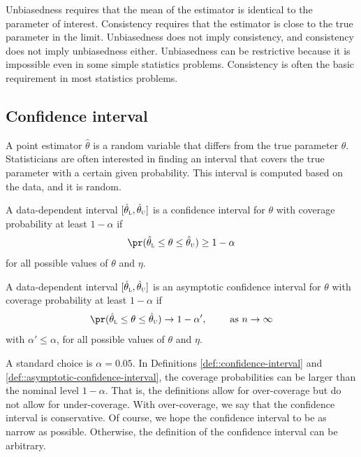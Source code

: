 Unbiasedness requires that the mean of the estimator is identical to the parameter of interest. Consistency requires that the estimator is close to the true parameter in the limit. Unbiasedness does not imply consistency, and consistency does not imply unbiasedness either. Unbiasedness can be restrictive because it is impossible even in some simple statistics problems. Consistency is often the basic requirement in most statistics problems. 





\subsection{Confidence interval}



A point estimator $\hat\theta$ is a random variable that differs from the true parameter $\theta$. Statisticians are often interested in finding an interval that covers the true parameter with a certain given probability. This interval is computed based on the data, and it is random. 

\begin{definition}
\label{def::confidence-interval}
A data-dependent interval $[  \hat\theta_\textsc{l} , \hat\theta_\textsc{u} ] $ is a confidence interval for $\theta$ with coverage probability at least $1-\alpha$ if
$$
\pr(    \hat\theta_\textsc{l}    \leq \theta \leq  \hat\theta_\textsc{u}  ) \geq 1-\alpha 
$$
for all possible values of $\theta$ and $\eta$.  
\end{definition}


\begin{definition}
\label{def::asymptotic-confidence-interval}
A data-dependent interval $[  \hat\theta_\textsc{l} , \hat\theta_\textsc{u} ] $ is an asymptotic confidence interval for $\theta$ with coverage probability at least $1-\alpha$ if
$$
\pr(    \hat\theta_\textsc{l}   \leq \theta \leq  \hat\theta_\textsc{u}  )   \rightarrow    1-\alpha'   ,\qquad \text{ as } n\rightarrow \infty
$$
with $\alpha '  \leq \alpha$, for all possible values of $\theta$ and $\eta$.     
\end{definition}


A standard choice is $\alpha = 0.05$. 
In Definitions \ref{def::confidence-interval} and \ref{def::asymptotic-confidence-interval}, the coverage probabilities can be larger than the nominal level $1-\alpha$. That is, the definitions allow for over-coverage but do not allow for under-coverage. With over-coverage, we say that the confidence interval is conservative. Of course, we hope the confidence interval to be as narrow as possible. Otherwise, the definition of the confidence interval can be arbitrary. 



